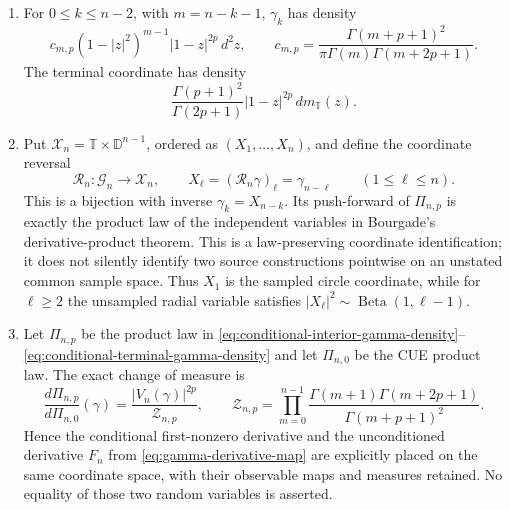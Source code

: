 \begin{sloppypar}
\begin{proposition}
\begin{enumerate}
 \item For $0\leq k\leq n-2$, with $m=n-k-1$, $\gamma_k$ has density
 \begin{equation}
  c_{m,p}(1-|z|^2)^{m-1}|1-z|^{2p}\,d^2z,
  \qquad
  c_{m,p}=\frac{\Gamma(m+p+1)^2}
  {\pi\Gamma(m)\Gamma(m+2p+1)}.
  \label{eq:conditional-interior-gamma-density}
 \end{equation}
 The terminal coordinate has density
 \begin{equation}
  \frac{\Gamma(p+1)^2}{\Gamma(2p+1)}|1-z|^{2p}\,dm_{\mathbb T}(z).
  \label{eq:conditional-terminal-gamma-density}
 \end{equation}

 \item Put $\mathcal X_n=\mathbb T\times\mathbb D^{n-1}$, ordered as
 $(X_1,\ldots,X_n)$, and define the coordinate reversal
 \begin{equation}
  \mathcal R_n:\mathcal G_n\longrightarrow\mathcal X_n,
  \qquad
  X_\ell=(\mathcal R_n\gamma)_\ell=\gamma_{n-\ell}
  \qquad(1\leq\ell\leq n).
  \label{eq:bourgade-X-gamma-reversal}
 \end{equation}
 This is a bijection with inverse $\gamma_k=X_{n-k}$.  Its push-forward of
 $\Pi_{n,p}$ is exactly the product law of the independent variables in Bourgade's
 derivative-product theorem.  This is a law-preserving coordinate identification;
 it does not silently identify two source constructions pointwise on an unstated
 common sample space.
 Thus $X_1$ is the sampled circle coordinate, while for $\ell\geq2$ the
 unsampled radial variable satisfies
 $|X_\ell|^2\sim\operatorname{Beta}(1,\ell-1)$.

 \item Let $\Pi_{n,p}$ be the product law in
 \eqref{eq:conditional-interior-gamma-density}--\eqref{eq:conditional-terminal-gamma-density}
 and let $\Pi_{n,0}$ be the CUE product law.  The exact change of measure is
 \begin{equation}
  \frac{d\Pi_{n,p}}{d\Pi_{n,0}}(\gamma)
  =\frac{|V_n(\gamma)|^{2p}}{\mathcal Z_{n,p}},
  \qquad
  \mathcal Z_{n,p}
  =\prod_{m=0}^{n-1}
   \frac{\Gamma(m+1)\Gamma(m+2p+1)}{\Gamma(m+p+1)^2}.
  \label{eq:conditional-radon-nikodym}
 \end{equation}
 Hence the conditional first-nonzero derivative and the unconditioned derivative
 $F_n$ from \eqref{eq:gamma-derivative-map} are explicitly placed on the same
 coordinate space, with their observable maps and measures retained.  No equality
 of those two random variables is asserted.
\end{enumerate}
\end{proposition}


\end{sloppypar}
